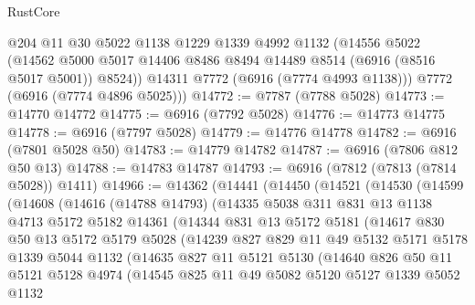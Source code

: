 \begin{lexlean}{RustCore}
\begin{coremodule}
        @204
        @11
        @30
        @5022
        @1138
        @1229
        @1339
        @4992
        @1132
        (@14556
          @5022
          (@14562 @5000 @5017 @14406 @8486 @8494 @14489 @8514 (@6916 (@8516 @5017 @5001)) @8524))
        @14311
        @7772
        (@6916 (@7774 @4993 @1138)))
      @7772
      (@6916 (@7774 @4896 @5025)))
@14772 := @7787 (@7788 @5028)
@14773 := @14770 @14772
@14775 := @6916 (@7792 @5028)
@14776 := @14773 @14775
@14778 := @6916 (@7797 @5028)
@14779 := @14776 @14778
@14782 := @6916 (@7801 @5028 @50)
@14783 := @14779 @14782
@14787 := @6916 (@7806 @812 @50 @13)
@14788 := @14783 @14787
@14793 := @6916 (@7812 (@7813 (@7814 @5028)) @1411)
@14966 := @14362
    (@14441
      (@14450
        (@14521
          (@14530
            (@14599
              (@14608
                (@14616
                  (@14788 @14793)
                  (@14335
                    @5038
                    @311
                    @831
                    @13
                    @1138
                    @4713
                    @5172
                    @5182
                    @14361
                    (@14344
                      @831
                      @13
                      @5172
                      @5181
                      (@14617
                        @830
                        @50
                        @13
                        @5172
                        @5179
                        @5028
                        (@14239
                          @827
                          @829
                          @11
                          @49
                          @5132
                          @5171
                          @5178
                          @1339
                          @5044
                          @1132
                          (@14635
                            @827
                            @11
                            @5121
                            @5130
                            (@14640
                              @826
                              @50
                              @11
                              @5121
                              @5128
                              @4974
                              (@14545
                                @825
                                @11
                                @49
                                @5082
                                @5120
                                @5127
                                @1339
                                @5052
                                @1132

\end{coremodule}
\end{lexlean}

